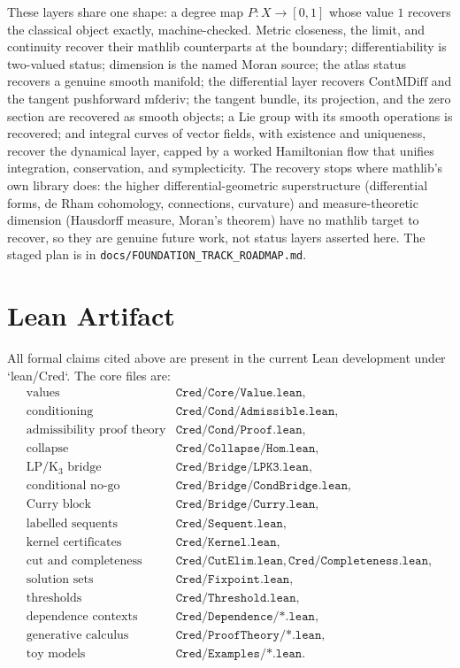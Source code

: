 \documentclass[11pt,a4paper]{article}
\newcommand{\Lean}[1]{\texttt{#1}}
\begin{document}
These layers share one shape: a degree map $P:X\to[0,1]$ whose value $1$
recovers the classical object exactly, machine-checked.  Metric
closeness, the limit, and continuity recover their mathlib counterparts
at the boundary; differentiability is two-valued status; dimension is the
named Moran source; the atlas status recovers a genuine smooth manifold;
the differential layer recovers $\mathrm{ContMDiff}$ and the tangent
pushforward $\mathrm{mfderiv}$; the tangent bundle, its projection, and
the zero section are recovered as smooth objects; a Lie group with its
smooth operations is recovered; and integral curves of vector fields,
with existence and uniqueness, recover the dynamical layer, capped by a
worked Hamiltonian flow that unifies integration, conservation, and
symplecticity.  The recovery stops
where mathlib's own library does: the higher differential-geometric
superstructure (differential forms, de Rham cohomology, connections,
curvature) and measure-theoretic dimension (Hausdorff measure, Moran's
theorem) have no mathlib target to recover, so they are genuine future
work, not status layers asserted here.  The staged plan is in
\texttt{docs/FOUNDATION\_TRACK\_ROADMAP.md}.

\section{Lean Artifact}

All formal claims cited above are present in the current Lean
development under `lean/Cred`.  The core files are:
\[
\begin{array}{ll}
\text{values} & \Lean{Cred/Core/Value.lean},\\
\text{conditioning} & \Lean{Cred/Cond/Admissible.lean},\\
\text{admissibility proof theory} & \Lean{Cred/Cond/Proof.lean},\\
\text{collapse} & \Lean{Cred/Collapse/Hom.lean},\\
\text{LP/K$_3$ bridge} & \Lean{Cred/Bridge/LPK3.lean},\\
\text{conditional no-go} & \Lean{Cred/Bridge/CondBridge.lean},\\
\text{Curry block} & \Lean{Cred/Bridge/Curry.lean},\\
\text{labelled sequents} & \Lean{Cred/Sequent.lean},\\
\text{kernel certificates} & \Lean{Cred/Kernel.lean},\\
\text{cut and completeness} & \Lean{Cred/CutElim.lean}, \Lean{Cred/Completeness.lean},\\
\text{solution sets} & \Lean{Cred/Fixpoint.lean},\\
\text{thresholds} & \Lean{Cred/Threshold.lean},\\
\text{dependence contexts} & \Lean{Cred/Dependence/*.lean},\\
\text{generative calculus} & \Lean{Cred/ProofTheory/*.lean},\\
\text{toy models} & \Lean{Cred/Examples/*.lean}.
\end{array}
\]
\end{document}
